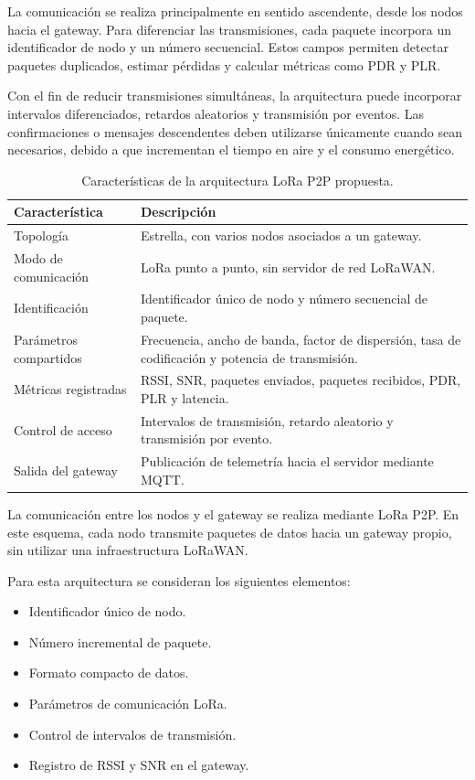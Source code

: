 La comunicación se realiza principalmente en sentido ascendente, desde los nodos hacia el gateway. Para diferenciar las transmisiones, cada paquete incorpora un identificador de nodo y un número secuencial. Estos campos permiten detectar paquetes duplicados, estimar pérdidas y calcular métricas como PDR y PLR.

Con el fin de reducir transmisiones simultáneas, la arquitectura puede incorporar intervalos diferenciados, retardos aleatorios y transmisión por eventos. Las confirmaciones o mensajes descendentes deben utilizarse únicamente cuando sean necesarios, debido a que incrementan el tiempo en aire y el consumo energético.

\begin{table}[H]
\centering
\caption{Características de la arquitectura LoRa P2P propuesta.}
\label{tab:arquitectura_lora_p2p}
\small
\renewcommand{\arraystretch}{1.2}
\begin{tabularx}{\linewidth}{
>{\raggedright\arraybackslash}p{4.2cm}
>{\raggedright\arraybackslash}X}
\toprule
\textbf{Característica} & \textbf{Descripción} \\
\midrule
Topología & Estrella, con varios nodos asociados a un gateway. \\
Modo de comunicación & LoRa punto a punto, sin servidor de red LoRaWAN. \\
Identificación & Identificador único de nodo y número secuencial de paquete. \\
Parámetros compartidos & Frecuencia, ancho de banda, factor de dispersión, tasa de codificación y potencia de transmisión. \\
Métricas registradas & RSSI, SNR, paquetes enviados, paquetes recibidos, PDR, PLR y latencia. \\
Control de acceso & Intervalos de transmisión, retardo aleatorio y transmisión por evento. \\
Salida del gateway & Publicación de telemetría hacia el servidor mediante MQTT. \\
\bottomrule
\end{tabularx}
\end{table}

La comunicación entre los nodos y el gateway se realiza mediante LoRa P2P. En este esquema, cada nodo transmite paquetes de datos hacia un gateway propio, sin utilizar una infraestructura LoRaWAN.

Para esta arquitectura se consideran los siguientes elementos:

\begin{itemize}
    \item Identificador único de nodo.
    \item Número incremental de paquete.
    \item Formato compacto de datos.
    \item Parámetros de comunicación LoRa.
    \item Control de intervalos de transmisión.
    \item Registro de RSSI y SNR en el gateway.
\end{itemize}

